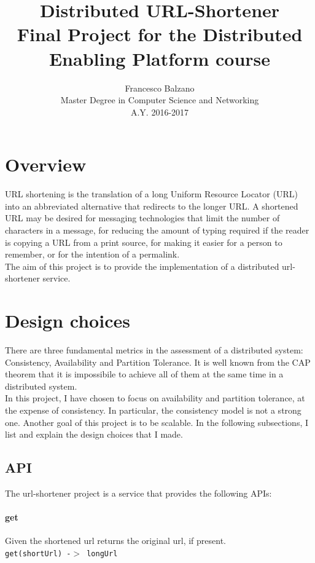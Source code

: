 \documentclass{article}
\title{ \textbf {\vspace{0.5cm}\Huge Distributed URL-Shortener \\}
 Final Project for the Distributed Enabling Platform course \vspace{15.0cm}\\}
\date{\vspace{2cm}}
\author{ \Large Francesco Balzano \vspace{0.3cm}\\ 
\Large Master Degree in Computer Science and Networking \vspace{0.4cm} \\
\Large A.Y. 2016-2017 
}
\begin{document}
  \maketitle
  \newpage
  \tableofcontents
  \newpage

\clearpage
\setcounter{page}{3}
  
\section{Overview}  
URL shortening is the translation of a long Uniform Resource Locator (URL) into an abbreviated alternative that redirects to the longer URL.  A shortened URL may be desired for messaging technologies that limit the number of characters in a message, for reducing the amount of typing required if the reader is copying a URL from a print source, for making it easier for a person to remember, or for the intention of a permalink.\\  
The aim of this project is to provide the implementation of a distributed url-shortener service.


\section{Design choices}
There are three fundamental metrics in the assessment of a distributed system: Consistency, Availability and Partition Tolerance. It is well known from the CAP theorem that it is impossibile to achieve all of them at the same time in a distributed system. \\ 
In this project, I have chosen to focus on availability and partition tolerance, at the expense of consistency. In particular, the consistency model is not a strong one. Another goal of this project is to be scalable.
In the following subsections, I list and explain the design choices that I made.


\subsection{API}
The url-shortener project is a service that provides the following APIs:

\paragraph{get}
Given the shortened url returns the original url, if present. \\
\texttt{get(shortUrl) -$>$ longUrl}
\end{document}
